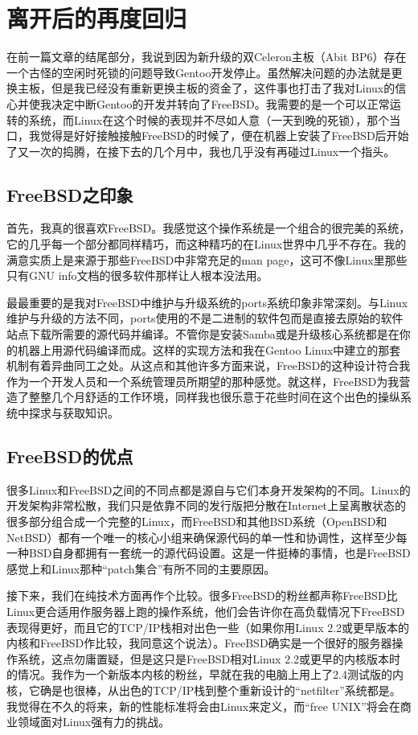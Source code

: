 \section{离开后的再度回归}

在前一篇文章的结尾部分，我说到因为新升级的双Celeron主板（Abit BP6）存在一个古怪的空闲时死锁的问题导致Gentoo开发停止。虽然解决问题的办法就是更换主板，但是我已经没有重新更换主板的资金了，这件事也打击了我对Linux的信心并使我决定中断Gentoo的开发并转向了FreeBSD。我需要的是一个可以正常运转的系统，而Linux在这个时候的表现并不尽如人意（一天到晚的死锁），那个当口，我觉得是好好接触接触FreeBSD的时候了，便在机器上安装了FreeBSD后开始了又一次的捣腾，在接下去的几个月中，我也几乎没有再碰过Linux一个指头。

\subsection{FreeBSD之印象}

首先，我真的很喜欢FreeBSD。我感觉这个操作系统是一个组合的很完美的系统，它的几乎每一个部分都同样精巧，而这种精巧的在Linux世界中几乎不存在。我的满意实质上是来源于那些FreeBSD中非常充足的man page，这可不像Linux里那些只有GNU info文档的很多软件那样让人根本没法用。

最最重要的是我对FreeBSD中维护与升级系统的ports系统印象非常深刻。与Linux维护与升级的方法不同，ports使用的不是二进制的软件包而是直接去原始的软件站点下载所需要的源代码并编译。不管你是安装Samba或是升级核心系统都是在你的机器上用源代码编译而成。这样的实现方法和我在Gentoo Linux中建立的那套机制有着异曲同工之处。从这点和其他许多方面来说，FreeBSD的这种设计符合我作为一个开发人员和一个系统管理员所期望的那种感觉。就这样，FreeBSD为我营造了整整几个月舒适的工作环境，同样我也很乐意于花些时间在这个出色的操纵系统中探求与获取知识。

\subsection{FreeBSD的优点}

很多Linux和FreeBSD之间的不同点都是源自与它们本身开发架构的不同。Linux的开发架构非常松散，我们只是依靠不同的发行版把分散在Internet上呈离散状态的很多部分组合成一个完整的Linux，而FreeBSD和其他BSD系统（OpenBSD和NetBSD）都有一个唯一的核心小组来确保源代码的单一性和协调性，这样至少每一种BSD自身都拥有一套统一的源代码设置。这是一件挺棒的事情，也是FreeBSD感觉上和Linux那种“patch集合”有所不同的主要原因。

接下来，我们在纯技术方面再作个比较。很多FreeBSD的粉丝都声称FreeBSD比Linux更合适用作服务器上跑的操作系统，他们会告许你在高负载情况下FreeBSD表现得更好，而且它的TCP/IP栈相对出色一些（如果你用Linux 2.2或更早版本的内核和FreeBSD作比较，我同意这个说法）。FreeBSD确实是一个很好的服务器操作系统，这点勿庸置疑，但是这只是FreeBSD相对Linux 2.2或更早的内核版本时的情况。我作为一个新版本内核的粉丝，早就在我的电脑上用上了2.4测试版的内核，它确是也很棒，从出色的TCP/IP栈到整个重新设计的“netfilter”系统都是。我觉得在不久的将来，新的性能标准将会由Linux来定义，而“free UNIX”将会在商业领域面对Linux强有力的挑战。

